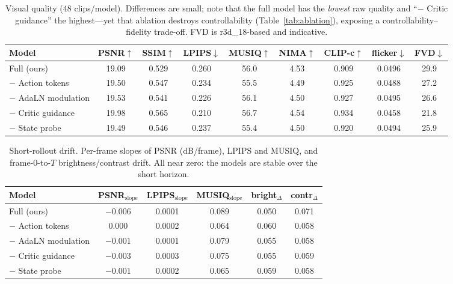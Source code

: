 \documentclass[letterpaper]{article} %
\begin{document}
\begin{table}[t]
\centering
\begin{tabular}{lcccccccc}
\toprule
Model & PSNR$\uparrow$ & SSIM$\uparrow$ & LPIPS$\downarrow$ & MUSIQ$\uparrow$ & NIMA$\uparrow$ & CLIP-c$\uparrow$ & flicker$\downarrow$ & FVD$\downarrow$ \\
\midrule
Full (ours)          & 19.09 & 0.529 & 0.260 & 56.0 & 4.53 & 0.909 & 0.0496 & 29.9 \\
$-$ Action tokens    & 19.50 & 0.547 & 0.234 & 55.5 & 4.49 & 0.925 & 0.0488 & 27.2 \\
$-$ AdaLN modulation & 19.53 & 0.541 & 0.226 & 56.1 & 4.50 & 0.927 & 0.0495 & 26.6 \\
$-$ Critic guidance  & 19.98 & 0.565 & 0.210 & 56.7 & 4.54 & 0.934 & 0.0458 & 21.8 \\
$-$ State probe      & 19.49 & 0.546 & 0.237 & 55.4 & 4.50 & 0.920 & 0.0494 & 25.9 \\
\bottomrule
\end{tabular}
\caption{Visual quality ($48$ clips/model). Differences are small; note that the full model has the \emph{lowest} raw quality and ``$-$ Critic guidance'' the highest---yet that ablation destroys controllability (Table~\ref{tab:ablation}), exposing a controllability--fidelity trade-off. FVD is r3d\_18-based and indicative.}
\label{tab:quality}
\end{table}

\begin{table}[t]
\centering
\setlength{\tabcolsep}{4pt}
\begin{tabular}{lccccc}
\toprule
Model & PSNR$_{\text{slope}}$ & LPIPS$_{\text{slope}}$ & MUSIQ$_{\text{slope}}$ & bright$_\Delta$ & contr$_\Delta$ \\
\midrule
Full (ours)          & $-0.006$ & 0.0001 & 0.089 & 0.050 & 0.071 \\
$-$ Action tokens    & $0.000$  & 0.0002 & 0.064 & 0.060 & 0.058 \\
$-$ AdaLN modulation & $-0.001$ & 0.0001 & 0.079 & 0.055 & 0.058 \\
$-$ Critic guidance  & $-0.003$ & 0.0003 & 0.075 & 0.055 & 0.059 \\
$-$ State probe      & $-0.001$ & 0.0002 & 0.065 & 0.059 & 0.058 \\
\bottomrule
\end{tabular}
\caption{Short-rollout drift. Per-frame slopes of PSNR (dB/frame), LPIPS and MUSIQ, and frame-$0$-to-$T$ brightness/contrast drift. All near zero: the models are stable over the short horizon.}
\label{tab:drift}
\end{table}
\end{document}

